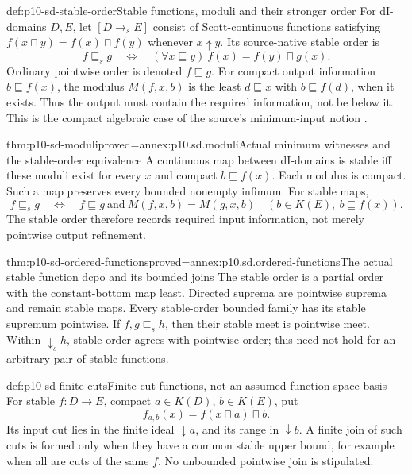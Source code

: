\begin{hbdefinition}{def:p10-sd-stable-order}{Stable functions, moduli and their stronger order}
For dI-domains \(D,E\), let \([D\longrightarrow_s E]\) consist of
Scott-continuous functions satisfying
\(f(x\sqcap y)=f(x)\sqcap f(y)\) whenever \(x\mathrel{\uparrow}y\).
Its source-native stable order is
\[
 f\sqsubseteq_s g\quad\Longleftrightarrow\quad
 (\forall x\sqsubseteq y)\ f(x)=f(y)\sqcap g(x).
\]
Ordinary pointwise order is denoted \(f\sqsubseteq g\).
For compact output information \(b\sqsubseteq f(x)\), the modulus
\(M(f,x,b)\) is the least \(d\sqsubseteq x\) with
\(b\sqsubseteq f(d)\), when it exists. Thus the output must contain
the required information, not be below it. This is the compact algebraic
case of the source's minimum-input notion
\cite[p.~36]{Gunter1994TypesAuthorOA}
\cite[p.~147]{AbramskyJungCorrectedExpandedDomainTheory}.
\end{hbdefinition}

\begin{hbtheorem}{thm:p10-sd-moduli}{proved=annex:p10.sd.moduli}{Actual minimum witnesses and the stable-order equivalence}
A continuous map between dI-domains is stable iff these moduli exist for
every \(x\) and compact \(b\sqsubseteq f(x)\). Each modulus is compact.
Such a map preserves every bounded nonempty infimum.
For stable maps,
\[
 f\sqsubseteq_s g\quad\Longleftrightarrow\quad
 f\sqsubseteq g\ \text{and}\
 M(f,x,b)=M(g,x,b)\quad(b\in K(E),\ b\sqsubseteq f(x)).
\]
The stable order therefore records required input information, not merely
pointwise output refinement.
\end{hbtheorem}

\begin{hbtheorem}{thm:p10-sd-ordered-functions}{proved=annex:p10.sd.ordered-functions}{The actual stable function dcpo and its bounded joins}
The stable order is a partial order with the constant-bottom map least.
Directed suprema are pointwise suprema and remain stable maps.
Every stable-order bounded family has its stable supremum pointwise.
If \(f,g\sqsubseteq_s h\), then their stable meet is pointwise meet.
Within \(\downarrow_s h\), stable order agrees with pointwise order;
this need not hold for an arbitrary pair of stable functions.
\end{hbtheorem}

\begin{hbdefinition}{def:p10-sd-finite-cuts}{Finite cut functions, not an assumed function-space basis}
For stable \(f:D\to E\), compact \(a\in K(D)\), \(b\in K(E)\), put
\[
                     f_{a,b}(x)=f(x\sqcap a)\sqcap b.
\]
Its input cut lies in the finite ideal \(\downarrow a\), and its
range in \(\downarrow b\). A finite join of such cuts is formed only
when they have a common stable upper bound, for example when all are
cuts of the same \(f\). No unbounded pointwise join is stipulated.
\end{hbdefinition}


